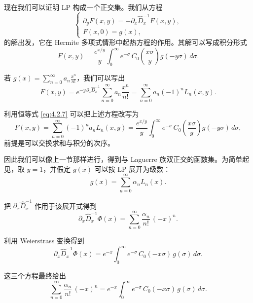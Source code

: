 现在我们可以证明 LP 构成一个正交集。我们从方程
\begin{equation}
\begin{cases}
\partial_y F(x,y) = -\partial_x \hat D_x^{-1} F(x,y),\\[2pt]
F(x,0) = g(x),
\end{cases}
\label{eq:4.3.2}
\end{equation}
的解出发，它在 Hermite 多项式情形中起热方程的作用。其解可以写成积分形式
\begin{equation}
F(x,y) = \frac{e^{x/y}}{y}\int_0^{\infty} e^{-\sigma}\,
C_0\!\left(\frac{x\sigma}{y}\right) g(-y\sigma)\,d\sigma.
\label{eq:4.3.3}
\end{equation}

若 $g(x) = \sum_{n=0}^{\infty} a_n \frac{x^n}{n!}$，我们可以写出
\begin{equation}
F(x,y) = e^{-y\,\partial_x \hat D_x^{-1}}
\sum_{n=0}^{\infty} a_n \frac{x^n}{n!}
= \sum_{n=0}^{\infty} a_n (-1)^n L_n(x,y).
\label{eq:4.3.4}
\end{equation}

利用恒等式 \eqref{eq:4.2.7} 可以把上述方程改写为
\begin{equation}
F(x,y) = \sum_{n=0}^{\infty} (-1)^n a_n L_n(x,y)
= \frac{e^{x/y}}{y}\int_0^{\infty} e^{-\sigma}\,
C_0\!\left(\frac{x\sigma}{y}\right) g(-y\sigma)\,d\sigma,
\label{eq:4.3.5}
\end{equation}
前提是可以交换求和与积分的次序。

因此我们可以像上一节那样进行，得到与 Laguerre 族双正交的函数集。为简单起见，取 $y=1$，并假定 $g(x)$ 可以按 LP 展开为级数：
\begin{equation}
g(x) = \sum_{n=0}^{\infty} \alpha_n L_n(x).
\label{eq:4.3.6}
\end{equation}

把 $\partial_x \hat D_x^{-1}$ 作用于该展开式得到
\begin{equation}
\partial_x \hat D_x^{-1} \Phi(x)
= \sum_{n=0}^{\infty} \frac{\alpha_n}{n!}\,(-x)^n.
\label{eq:4.3.7}
\end{equation}

利用 Weierstrass 变换得到
\begin{equation}
\partial_x \hat D_x^{-1} \Phi(x)
= e^{-x}\int_0^{\infty} e^{-\sigma}\,C_0(-x\sigma)\,g(\sigma)\,d\sigma.
\label{eq:4.3.8}
\end{equation}

这三个方程最终给出
\begin{equation}
\sum_{n=0}^{\infty} \frac{\alpha_n}{n!}\,(-x)^n
= e^{-x}\int_0^{\infty} e^{-\sigma}\,C_0(-x\sigma)\,g(\sigma)\,d\sigma.
\label{eq:4.3.9}
\end{equation}

